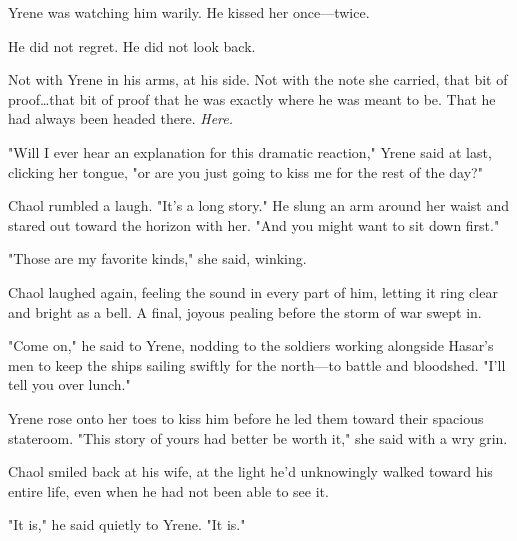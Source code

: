 Yrene was watching him warily.
He kissed her once---twice.

He did not regret.
He did not look back.

Not with Yrene in his arms, at his side.
Not with the note she carried, that bit of proof\ldots that bit of proof that he was exactly where he was meant to be.
That he had always been headed there.
\emph{Here.}

"Will I ever hear an explanation for this dramatic reaction," Yrene said at last, clicking her tongue, "or are you just going to kiss me for the rest of the day?"

Chaol rumbled a laugh.
"It's a long story."
He slung an arm around her waist and stared out toward the horizon with her.
"And you might want to sit down first."

"Those are my favorite kinds," she said, winking.

Chaol laughed again, feeling the sound in every part of him, letting it ring clear and bright as a bell.
A final, joyous pealing before the storm of war swept in.

"Come on," he said to Yrene, nodding to the soldiers working alongside Hasar's men to keep the ships sailing swiftly for the north---to battle and bloodshed.
"I'll tell you over lunch."

Yrene rose onto her toes to kiss him before he led them toward their spacious stateroom.
"This story of yours had better be worth it," she said with a wry grin.

Chaol smiled back at his wife, at the light he'd unknowingly walked toward his entire life, even when he had not been able to see it.

"It is," he said quietly to Yrene.
"It is."

